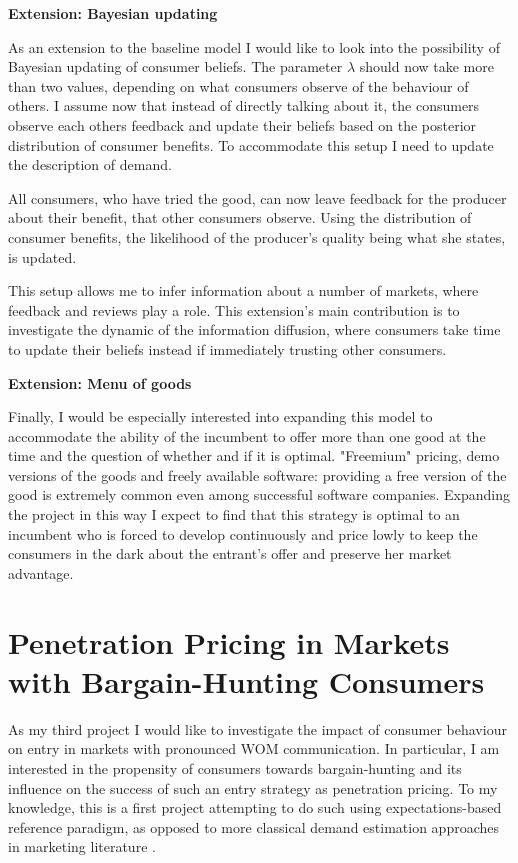 \documentclass[13pt]{article}
\numberwithin{figure}{section}
\numberwithin{table}{section}
\theoremstyle{indented}
\numberwithin{equation}{section} %
\begin{document}
\textbf{Extension: Bayesian updating}

As an extension to the baseline model I would like to look into the possibility of Bayesian updating of consumer beliefs. The parameter $\lambda$ should now take more than two values, depending on what consumers observe of the behaviour of others.  I assume now that instead of directly talking about it, the consumers observe each others feedback and update their beliefs based on the posterior distribution of consumer benefits. To accommodate this setup I need to update the description of demand.

All consumers, who have tried the good, can now leave feedback for the producer about their benefit, that other consumers observe. Using the distribution of consumer benefits, the likelihood of the producer's quality being what she states, is updated. 

This setup allows me to infer information about a number of markets, where feedback and reviews play a role. This extension's main contribution is to investigate the dynamic of the information diffusion, where consumers take time to update their beliefs instead if immediately trusting other consumers.

\textbf{Extension: Menu of goods}

Finally, I would be especially interested into expanding this model to accommodate the ability of the incumbent to offer more than one good at the time and the question of whether and if it is optimal. "Freemium" pricing, demo versions of the goods and freely available software: providing a free version of the good is extremely common even among successful software companies. Expanding the project in this way I expect to find that this strategy is optimal to an incumbent who is forced to develop continuously and price lowly to keep the consumers in the dark about the entrant's offer and preserve her market advantage.

\newpage

\section{Penetration Pricing in Markets with Bargain-Hunting Consumers}

As my third project I would like to investigate the impact of consumer behaviour on entry in markets with pronounced WOM communication. In particular, I am interested in the propensity of consumers towards bargain-hunting and its influence on the success of such an entry strategy as penetration pricing. To my knowledge, this is a first project attempting to do such using expectations-based reference paradigm, as opposed to more classical demand estimation approaches in marketing literature \citet{penetration}.
\end{document}
